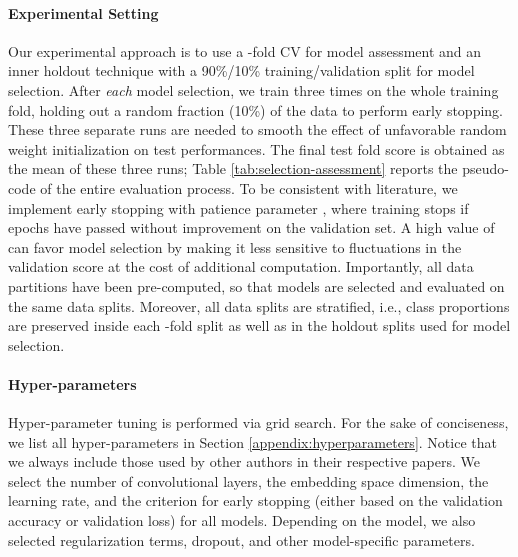 \documentclass{article}
\newcommand{\ie}{i.e., }
\begin{document}
\paragraph{Experimental Setting} Our experimental approach is to use a -fold CV for model assessment and an inner holdout technique with a 90\%/10\% training/validation split for model selection. After \emph{each} model selection, we train three times on the whole training fold, holding out a random fraction (10\%) of the data to perform early stopping. These three separate runs are needed to smooth the effect of unfavorable random weight initialization on test performances. The final test fold score is obtained as the mean of these three runs; Table \ref{tab:selection-assessment} reports the pseudo-code of the entire evaluation process. To be consistent with literature, we implement early stopping with patience parameter , where training stops if  epochs have passed without improvement on the validation set. A high value of  can favor model selection by making it less sensitive to fluctuations in the validation score at the cost of additional computation. Importantly, all data partitions have been pre-computed, so that models are selected and evaluated on the same data splits. Moreover, all data splits are stratified, \ie class proportions are preserved inside each -fold split as well as in the holdout splits used for model selection.

\paragraph{Hyper-parameters}
Hyper-parameter tuning is performed via grid search. For the sake of conciseness, we list all hyper-parameters in Section \ref{appendix:hyperparameters}. Notice that we always include those used by other authors in their respective papers. We select the number of convolutional layers, the embedding space dimension, the learning rate, and the criterion for early stopping (either based on the validation accuracy or validation loss) for all models. Depending on the model, we also selected regularization terms, dropout, and other model-specific parameters.
\end{document}
